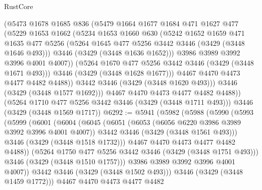 \begin{lexlean}{RustCore}
\begin{coremodule}
              (@5473
                @1678
                @1685
                @836
                (@5479
                  @1664
                  @1677
                  @1684
                  @471
                  @1627
                  @477
                  (@5229
                    @1653
                    @1662
                    (@5234
                      @1653
                      @1660
                      @630
                      (@5242
                        @1652
                        @1659
                        @471
                        @1635
                        @477
                        @5256
                        (@5264 @1645 @477 @5256 @3442 @3446 (@3429 (@3448 @1646 @493)))
                        @3446
                        (@3429 (@3448 @1636 @1652)))
                      @3986
                      @3989
                      @3992
                      @3996
                      @4001
                      @4007))
                  (@5264 @1670 @477 @5256 @3442 @3446 (@3429 (@3448 @1671 @493)))
                  @3446
                  (@3429 (@3448 @1628 @1677)))
                @4467
                @4470
                @4473
                @4477
                @4482
                @4488))
            @3442
            @3446
            (@3429 (@3448 @1620 @493)))
          @3446
          (@3429 (@3448 @1577 @1692)))
        @4467
        @4470
        @4473
        @4477
        @4482
        @4488))
    (@5264 @1710 @477 @5256 @3442 @3446 (@3429 (@3448 @1711 @493)))
    @3446
    (@3429 (@3448 @1569 @1717))
@6292 := @5941
    (@5982
      (@5988
        (@5990
          (@5993
            (@5999
              (@6001
                (@6004
                  (@6045
                    (@6051
                      (@6053 (@6056 @6220 @3986 @3989 @3992 @3996 @4001 @4007))
                      @3442
                      @3446
                      (@3429 (@3448 @1561 @493)))
                    @3446
                    (@3429 (@3448 @1518 @1732)))
                  @4467
                  @4470
                  @4473
                  @4477
                  @4482
                  @4488))
              (@5264 @1750 @477 @5256 @3442 @3446 (@3429 (@3448 @1751 @493)))
              @3446
              (@3429 (@3448 @1510 @1757)))
            @3986
            @3989
            @3992
            @3996
            @4001
            @4007))
        @3442
        @3446
        (@3429 (@3448 @1502 @493)))
      @3446
      (@3429 (@3448 @1459 @1772)))
    @4467
    @4470
    @4473
    @4477
    @4482

\end{coremodule}
\end{lexlean}
